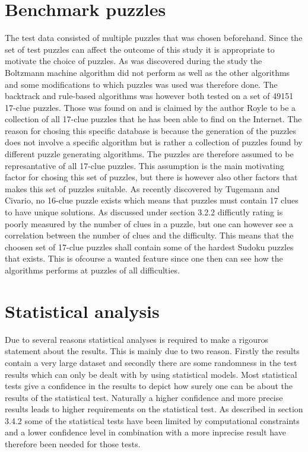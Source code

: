 \documentclass[a4paper,11pt]{kth-mag}
\begin{document}
\section{Benchmark puzzles}
The test data consisted of multiple puzzles that was chosen beforehand.
Since the set of test puzzles can affect the outcome of this study it is appropriate to motivate the choice of puzzles.
As was discovered during the study the Boltzmann machine algorithm did not perform as well as the other algorithms and some modifications to which puzzles was used was therefore done.
The backtrack and rule-based algorithms was however both tested on a set of 49151 17-clue puzzles. 
Those was found on \cite{database} and is claimed by the author Royle to be a collection of all 17-clue puzzles that he has been able to find on the Internet. 
The reason for chosing this specific database is because the generation of the puzzles does not involve a specific algorithm but is rather a collection of puzzles found by different puzzle generating algorithms.  
The puzzles are therefore assumed to be represantative of all 17-clue puzzles. 
This assumption is the main motivating factor for chosing this set of puzzles, but there is however also other factors that makes this set of puzzles suitable. 
As recently discovered by Tugemann and Civario, no 16-clue puzzle exists which means that puzzles must contain 17 clues to have unique solutions. \cite{17clueProof}  
As discussed under section 3.2.2 difficutly rating is poorly measured by the number of clues in a puzzle, but one can however see a correlation between the number of clues and the difficulty. \cite{difficulty}
This means that the choosen set of 17-clue puzzles shall contain some of the hardest Sudoku puzzles that exists.
This is ofcourse a wanted feature since one then can see how the algorithms performs at puzzles of all difficulties.

\FloatBarrier
\section{Statistical analysis}
Due to several reasons statistical analyses is required to make a rigouros statement about the results. 
This is mainly due to two reason.
Firstly the results contain a very large dataset and secondly there are some randomness in the test results which can only be dealt with by using statistical models. 
Most statistical tests give a confidence in the results to depict how surely one can be about the results of the statistical test. Naturally a higher confidence and more precise results leads to higher requirements on the statistical test. As described in section 3.4.2 some of the statistical tests have been limited by computational constraints and a lower confidence level in combination with a more inprecise result have therefore been needed for those tests.
\end{document}
